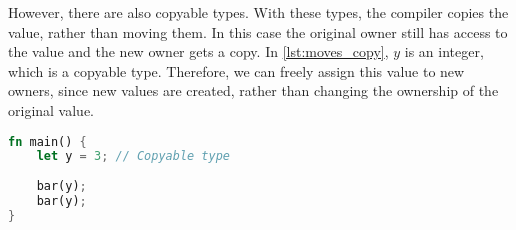 However, there are also copyable types. With these types, the compiler copies the value, rather than moving them. In this case the original owner still has access to the value and the new owner gets a copy.
In \autoref{lst:moves_copy}, $y$ is an integer, which is a copyable type. Therefore, we can freely assign this value to new owners, since new values are created, rather than changing the ownership of the original value. 

\begin{lstlisting}[language=rust, showstringspaces=false, escapechar=~, label={lst:moves_copy}, caption={Example of copyable type}]
fn main() { 
    let y = 3; // Copyable type
    
    bar(y);
    bar(y); 
}
\end{lstlisting}


